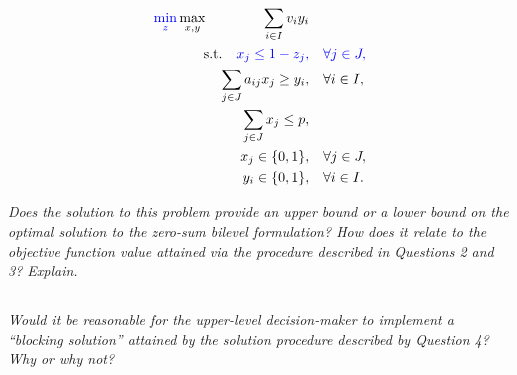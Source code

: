 \documentclass[12pt]{amsart}
\begin{document}
	\begin{align*}
		{\color{blue}\min_z}\max_{x,y} \qquad\qquad \sum_{i\in I} v_iy_i& \\
		\text{s.t.}\quad
		{\color{blue} x_j \leq 1-z_j,}& \quad {\color{blue}\forall j\in J,}\\
		\sum_{j\in J} a_{ij}x_j \geq y_i,& \quad \forall i\in I, \\
		\sum_{j\in J} x_j \leq p,& \\
		x_j \in \{0,1\},& \quad \forall j\in J, \\
		y_i \in \{0,1\},& \quad \forall i\in I.
	\end{align*}

\textit{Does the solution to this problem provide an upper bound or a lower bound on the optimal
	solution to the zero-sum bilevel formulation? How does it relate to the objective function
	value attained via the procedure described in Questions 2 and 3? Explain.}
	

\subsection{}
\textit{Would it be reasonable for the upper-level decision-maker to implement a “blocking
	solution” attained by the solution procedure described by Question 4? Why or why not?}
\end{document}

